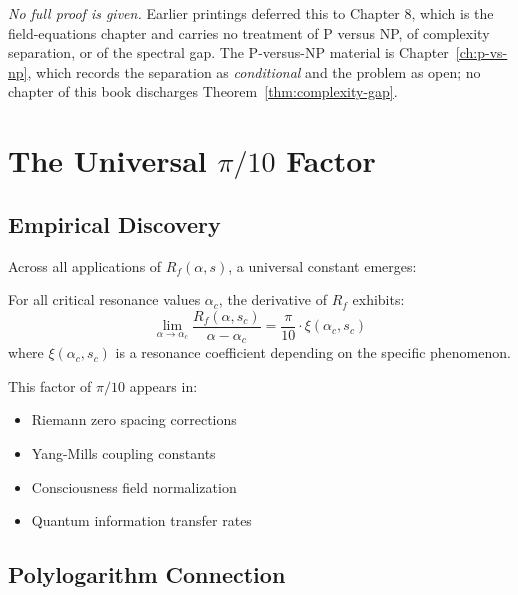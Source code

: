 \textit{No full proof is given.}  Earlier printings deferred this to
Chapter 8, which is the field-equations chapter and carries no treatment of
P versus NP, of complexity separation, or of the spectral gap.  The P-versus-NP
material is Chapter~\ref{ch:p-vs-np}, which records the separation as
\emph{conditional} and the problem as open; no chapter of this book discharges
Theorem~\ref{thm:complexity-gap}.

\section{The Universal \texorpdfstring{$\pi/10$}{pi/10} Factor}
\label{sec:pi-over-10}


\subsection{Empirical Discovery}

Across all applications of $R_f(\alpha, s)$, a universal constant emerges:

\begin{observation}
For all critical resonance values $\alpha_c$, the derivative of $R_f$ exhibits:
\begin{equation}
\lim_{\alpha \to \alpha_c} \frac{R_f(\alpha, s_c)}{\alpha - \alpha_c} = \frac{\pi}{10} \cdot \xi(\alpha_c, s_c)
\end{equation}
where $\xi(\alpha_c, s_c)$ is a resonance coefficient depending on the specific phenomenon.
\end{observation}

This factor of $\pi/10$ appears in:
\begin{itemize}
\item Riemann zero spacing corrections
\item Yang-Mills coupling constants
\item Consciousness field normalization
\item Quantum information transfer rates
\end{itemize}

\subsection{Polylogarithm Connection}


